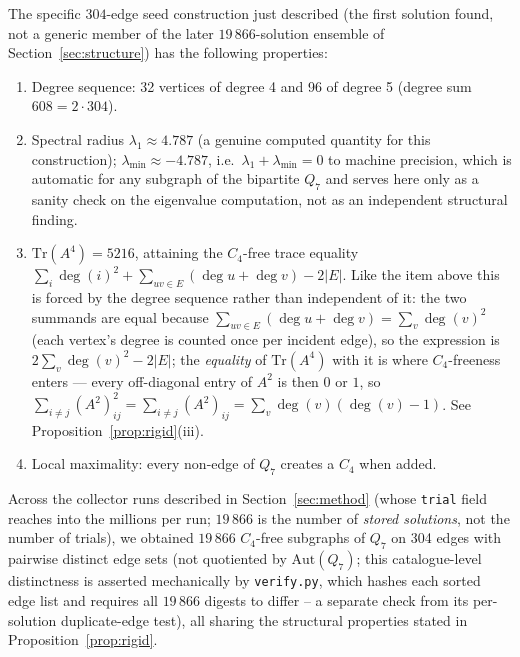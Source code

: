 \documentclass[12pt]{article}
\begin{document}
\begin{proposition}\label{prop:q7}
The specific $304$-edge seed construction just described (the first
solution found, not a generic member of the later $19\,866$-solution
ensemble of Section~\ref{sec:structure}) has the following properties:
\begin{enumerate}[label=(\roman*)]
  \item Degree sequence: 32 vertices of degree 4 and 96 of degree 5
    (degree sum $608=2\cdot304$).
  \item Spectral radius $\lambda_1\approx4.787$ (a genuine computed
    quantity for this construction); $\lambda_{\min}\approx-4.787$, i.e.\
    $\lambda_1+\lambda_{\min}=0$ to machine precision, which is automatic
    for any subgraph of the bipartite $Q_7$ and serves here only as a
    sanity check on the eigenvalue computation, not as an independent
    structural finding.
  \item $\mathrm{Tr}(A^4)=5216$, attaining the $C_4$-free trace equality
    $\sum_i\deg(i)^2+\sum_{uv\in E}(\deg u+\deg v)-2|E|$. Like the item above
    this is forced by the degree sequence rather than independent of it: the
    two summands are equal because
    $\sum_{uv\in E}(\deg u+\deg v)=\sum_v\deg(v)^2$ (each vertex's degree
    is counted once per incident edge), so the expression is
    $2\sum_v\deg(v)^2-2|E|$; the \emph{equality} of $\mathrm{Tr}(A^4)$
    with it is where $C_4$-freeness enters --- every off-diagonal entry of
    $A^2$ is then $0$ or $1$, so
    $\sum_{i\ne j}(A^2)_{ij}^2=\sum_{i\ne j}(A^2)_{ij}
    =\sum_v\deg(v)(\deg(v)-1)$. See
    Proposition~\ref{prop:rigid}(iii).
  \item Local maximality: every non-edge of $Q_7$ creates a $C_4$ when added.
\end{enumerate}
\end{proposition}

Across the collector runs described in Section~\ref{sec:method} (whose
\texttt{trial} field reaches into the millions per run; $19\,866$ is
the number of \emph{stored solutions}, not the number of trials),
we obtained $19\,866$ $C_4$-free subgraphs of $Q_7$ on 304 edges with
pairwise distinct edge sets (not quotiented by $\mathrm{Aut}(Q_7)$; this
catalogue-level distinctness is asserted mechanically by \texttt{verify.py},
which hashes each sorted edge list and requires all $19\,866$ digests to
differ -- a separate check from its per-solution duplicate-edge test),
all sharing the structural properties stated in Proposition~\ref{prop:rigid}.
\end{document}
